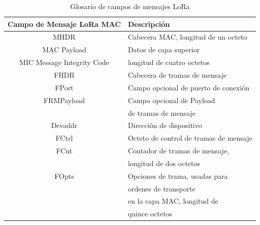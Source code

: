 \begin{justify}
\begin{table}[!ht]
\begin{tabular}{|c|l|}
\hline
Campo de Mensaje LoRa MAC & Descripción \\\hline
MHDR & Cabecera	MAC, longitud de un octeto\\\hline
MAC Payload	& Datos de capa superior\\\hline
MIC	Message Integrity Code & longitud de cuatro octetos\\\hline
FHDR  &	Cabecera de tramas de mensaje\\\hline
FPort	& Campo opcional de puerto de conexión\\\hline
FRMPayload	& Campo opcional de Payload \\&de tramas de mensaje\\\hline
Devaddr	& Dirección de dispositivo\\\hline
FCtrl & Octeto de control de tramas de mensaje\\\hline
FCnt &	Contador de tramas de mensaje,\\& longitud de dos octetos\\\hline
FOpts &	Opciones de trama, usadas para \\&ordenes de transporte\\ & en la capa MAC, longitud de \\&quince octetos\\\hline
\end{tabular}
\caption{Glosario de campos de mensajes LoRa}
\label{tab:loramsg}
\end{table}

\end{justify}
